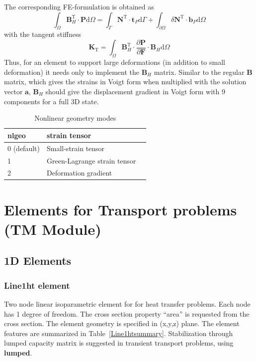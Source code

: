 \documentclass[a4paper]{article}
\newcommand{\entKeywordInst}[1]{\textbf{#1}} %
\begin{document}
The corresponding FE-formulation is obtained as
\begin{equation}
	\int_{\Omega} \mathbf{B}_H^{\mathrm{T}} \cdot \mathbf{P} \mathrm{d} \Omega = \int_{\Gamma} \mathbf{N}^{\mathrm{T}} \cdot \mathbf{t}_P  \mathrm{d} \Gamma
	+ \int_{\partial \Omega} \delta \mathbf{N}^{\mathrm{T}} \cdot \mathbf{b}_P  \mathrm{d} \Omega
\end{equation} 
with the tangent stiffness
\begin{equation}
	\mathbf{K}_{\mathrm{T}} = \int_{\Omega} \mathbf{B}_H^{\mathrm{T}} \cdot \frac{\partial \mathbf{P}}{\partial \mathbf{F} } \cdot \mathbf{B}_H \mathrm{d} \Omega 
\end{equation} 
Thus, for an element to support large deformations (in addition to small deformation) it needs only to implement the $\mathbf{B}_H$ matrix. 
Similar to the regular \textbf{B} matrix, which gives the strains in Voigt form when multiplied with the solution vector $\textbf{a}$, 
$\textbf{B}_H$ should give the displacement gradient in Voigt form with 9 components for a full 3D state.
%
\begin{table}
  \centering
  \begin{tabular}{lll}
    \hline
    nlgeo & strain tensor\\
    \hline
    0 (default) & Small-strain tensor\\
    1 & Green-Lagrange strain tensor\\
    2 & Deformation gradient\\
    \hline
  \end{tabular}
  \caption{Nonlinear geometry modes} \label{strain_tensor_table}
\end{table}

\clearpage
\section{Elements for Transport problems (TM Module)}
\subsection{1D Elements}
\subsubsection{Line1ht element}
\label{Line1ht}
Two node linear isoparametric element for for heat transfer problems. Each node has 1 degree of freedom.
The cross section property ``area'' is requested from the cross section. The
element geometry is specified in (x,y,z) plane. The element features are summarized in Table~\ref{Line1htsummary}.
Stabilization through lumped capacity matrix is suggested in transient transport problems, using \entKeywordInst{lumped}.
\end{document}
